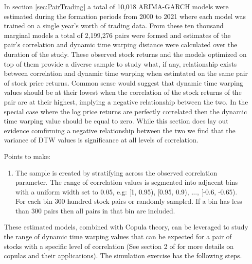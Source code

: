 \documentclass[12pt]{article}
\begin{document}
In section \ref{sec:PairTrading} a total of 10,018 ARIMA-GARCH models were estimated during the formation periods from 2000 to 2021 where each model was trained on a single year's worth of trading data. From these ten thousand marginal models a total of 2,199,276 pairs were formed and estimates of the pair's correlation and dynamic time warping distance were calculated over the duration of the study. These observed stock returns and the models optimized on top of them provide a diverse sample to study what, if any, relationship exists between correlation and dynamic time warping when estimtated on the same pair of stock price returns. Common sense would suggest that dynamic time warping values should be at their lowest when the correlation of the stock returns of the pair are at their highest, implying a negative relationship between the two. In the special case where the log price returns are perfectly correlated then the dynamic time warping value should be equal to zero. While this section does lay out evidence comfirming a negative relationship between the two we find that the variance of DTW values is significance at all levels of correlation. 

Points to make:
\begin{enumerate}
    \item The sample is created by stratifying across the observed correlation parameter. The range of correlation values is segmented into adjacent bins with a uniform width set to 0.05, e.g: [1, 0.95), [0.95, 0.9), ..., [-0.6, -0.65). For each bin 300 hundred stock pairs or randomly sampled. If a bin has less than 300 pairs then all pairs in that bin are included.
\end{enumerate}

These estimated models, combined with Copula theory, can be leveraged to study the range of dynamic time warping values that can be expected for a pair of stocks with a specific level of correlation (See section 2 of \cite{DowiakTV-COP} for more details on copulas and their applications). The simulation exercise has the following steps.
\end{document}
